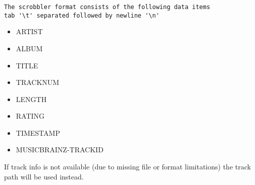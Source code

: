 \begin{verbatim}
The scrobbler format consists of the following data items
tab '\t' separated followed by newline '\n'
\end{verbatim}

\begin{itemize}
\item ARTIST
\item ALBUM
\item TITLE
\item TRACKNUM
\item LENGTH
\item RATING
\item TIMESTAMP
\item MUSICBRAINZ-TRACKID
\end{itemize}

If track info is not available (due to missing file or format limitations)
the track path will be used instead.
